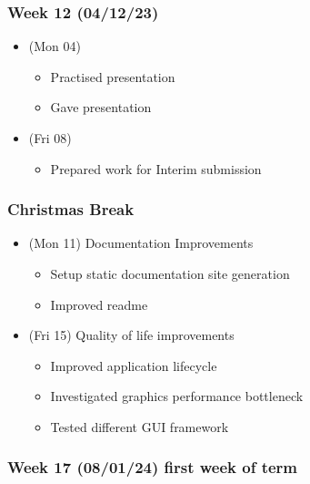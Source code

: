 \hypertarget{week-12-041223}{%
\subsubsection{Week 12 (04/12/23)}\label{week-12-041223}}

\begin{itemize}
\tightlist
\item
  (Mon 04)

  \begin{itemize}
  \tightlist
  \item
    Practised presentation
  \item
    Gave presentation
  \end{itemize}
\item
  (Fri 08)

  \begin{itemize}
  \tightlist
  \item
    Prepared work for Interim submission
  \end{itemize}
\end{itemize}

\hypertarget{christmas-break}{%
\subsubsection{Christmas Break}\label{christmas-break}}

\begin{itemize}
\tightlist
\item
  (Mon 11) Documentation Improvements

  \begin{itemize}
  \tightlist
  \item
    Setup static documentation site generation
  \item
    Improved readme
  \end{itemize}
\item
  (Fri 15) Quality of life improvements

  \begin{itemize}
  \tightlist
  \item
    Improved application lifecycle
  \item
    Investigated graphics performance bottleneck
  \item
    Tested different GUI framework
  \end{itemize}
\end{itemize}
\newpage
\hypertarget{week-17-080124-first-week-of-term}{%
\subsubsection{Week 17 (08/01/24) first week of
term}\label{week-17-080124-first-week-of-term}}

